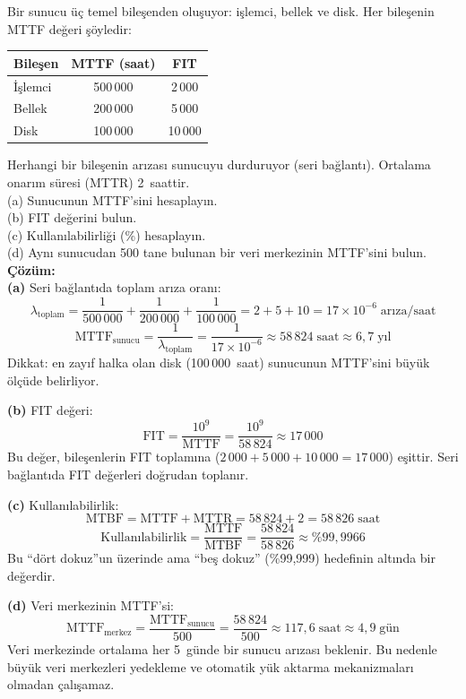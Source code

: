 \begin{ornek}[1.7]
Bir sunucu üç temel bileşenden oluşuyor: işlemci, bellek ve disk. Her bileşenin MTTF değeri şöyledir:
\begin{center}
\small
\begin{tabular}{@{}lcc@{}}
\toprule
\textbf{Bileşen} & \textbf{MTTF (saat)} & \textbf{FIT} \\
\midrule
İşlemci  & 500\,000 & 2\,000 \\
Bellek   & 200\,000 & 5\,000 \\
Disk     & 100\,000 & 10\,000 \\
\bottomrule
\end{tabular}
\end{center}

\noindent Herhangi bir bileşenin arızası sunucuyu durduruyor (seri bağlantı). Ortalama onarım süresi (MTTR) 2~saattir.\\[4pt]
(a) Sunucunun MTTF'sini hesaplayın.\\
(b) FIT değerini bulun.\\
(c) Kullanılabilirliği (\%) hesaplayın.\\
(d) Aynı sunucudan 500 tane bulunan bir veri merkezinin MTTF'sini bulun.\\[6pt]
\textbf{Çözüm:}\\[2pt]
\textbf{(a)} Seri bağlantıda toplam arıza oranı:
\[
\lambda_{\text{toplam}} = \frac{1}{500\,000} + \frac{1}{200\,000} + \frac{1}{100\,000} = 2 + 5 + 10 = 17 \times 10^{-6}\;\text{arıza/saat}
\]
\[
\text{MTTF}_{\text{sunucu}} = \frac{1}{\lambda_{\text{toplam}}} = \frac{1}{17 \times 10^{-6}} \approx 58\,824\;\text{saat} \approx 6{,}7\;\text{yıl}
\]
Dikkat: en zayıf halka olan disk (100\,000~saat) sunucunun MTTF'sini büyük ölçüde belirliyor.

\textbf{(b)} FIT değeri:
\[
\text{FIT} = \frac{10^9}{\text{MTTF}} = \frac{10^9}{58\,824} \approx 17\,000
\]
Bu değer, bileşenlerin FIT toplamına ($2\,000 + 5\,000 + 10\,000 = 17\,000$) eşittir. Seri bağlantıda FIT değerleri doğrudan toplanır.

\textbf{(c)} Kullanılabilirlik:
\[
\text{MTBF} = \text{MTTF} + \text{MTTR} = 58\,824 + 2 = 58\,826\;\text{saat}
\]
\[
\text{Kullanılabilirlik} = \frac{\text{MTTF}}{\text{MTBF}} = \frac{58\,824}{58\,826} \approx \%99{,}9966
\]
Bu ``dört dokuz''un üzerinde ama ``beş dokuz'' (\%99,999) hedefinin altında bir değerdir.

\textbf{(d)} Veri merkezinin MTTF'si:
\[
\text{MTTF}_{\text{merkez}} = \frac{\text{MTTF}_{\text{sunucu}}}{500} = \frac{58\,824}{500} \approx 117{,}6\;\text{saat} \approx 4{,}9\;\text{gün}
\]
Veri merkezinde ortalama her 5~günde bir sunucu arızası beklenir. Bu nedenle büyük veri merkezleri yedekleme ve otomatik yük aktarma mekanizmaları olmadan çalışamaz.
\end{ornek}

